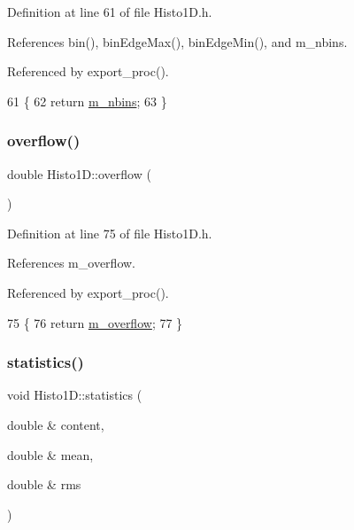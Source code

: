 Definition at line 61 of file Histo1\+D.\+h.



References bin(), bin\+Edge\+Max(), bin\+Edge\+Min(), and m\+\_\+nbins.



Referenced by export\+\_\+proc().


\begin{DoxyCode}
61                       \{
62     \textcolor{keywordflow}{return} \hyperlink{classHisto1D_a1913aca9a278b4bfd365f35b85e65d8d}{m\_nbins};
63   \}
\end{DoxyCode}
\mbox{\label{classHisto1D_a5d13018047a4ffb15e662f44a0a3f520}} 
\subsubsection{\texorpdfstring{overflow()}{overflow()}}
{\footnotesize\ttfamily double Histo1\+D\+::overflow (\begin{DoxyParamCaption}{ }\end{DoxyParamCaption})\hspace{0.3cm}{\ttfamily [inline]}}



Definition at line 75 of file Histo1\+D.\+h.



References m\+\_\+overflow.



Referenced by export\+\_\+proc().


\begin{DoxyCode}
75                    \{
76     \textcolor{keywordflow}{return} \hyperlink{classHisto1D_ab60b2ec4e435a3094b7ec218404aa16f}{m\_overflow};
77   \}
\end{DoxyCode}
\mbox{\label{classHisto1D_acc0d6f2080b0cfafc85ebc49cf0efc31}} 
\subsubsection{\texorpdfstring{statistics()}{statistics()}}
{\footnotesize\ttfamily void Histo1\+D\+::statistics (\begin{DoxyParamCaption}\item[{double \&}]{content,  }\item[{double \&}]{mean,  }\item[{double \&}]{rms }\end{DoxyParamCaption})}



